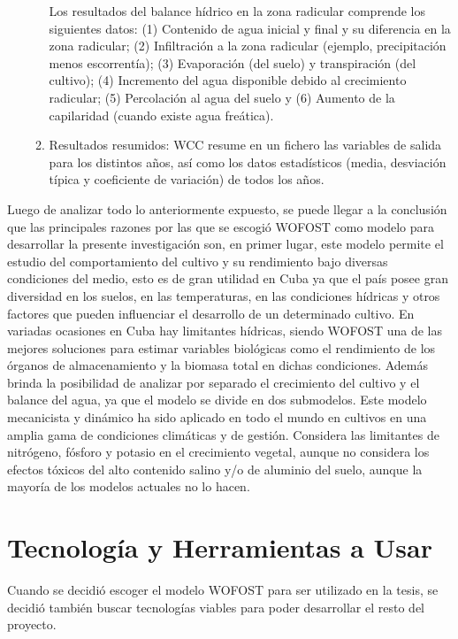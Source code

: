 \begin{enumerate}
\begin{enumerate}
		Los resultados del balance hídrico en la zona radicular comprende los siguientes datos: (1) Contenido de agua inicial y final y su diferencia en la zona radicular; (2) Infiltración a la zona radicular (ejemplo, precipitación menos escorrentía); (3) Evaporación (del suelo) y transpiración (del cultivo); (4) Incremento del agua disponible debido al crecimiento radicular; (5) Percolación al agua del suelo y (6) Aumento de la capilaridad (cuando existe agua freática).
		
		\item Resultados resumidos: WCC resume en un fichero las variables de salida para los distintos años, así como los datos estadísticos (media, desviación típica y coeficiente de variación) de todos los años.
	\end{enumerate}
\end{enumerate}

Luego de analizar todo lo anteriormente expuesto, se puede llegar a la conclusión que las principales razones por las que se escogió WOFOST como modelo para desarrollar la presente investigación son, en primer lugar, este modelo permite el estudio del comportamiento del cultivo y su rendimiento bajo diversas condiciones del medio, esto es de gran utilidad en Cuba ya que el país posee gran diversidad en los suelos, en las temperaturas, en las condiciones hídricas y otros factores que pueden influenciar el desarrollo de un determinado cultivo. En variadas ocasiones en Cuba hay limitantes hídricas, siendo WOFOST una de las mejores soluciones para estimar variables biológicas como el rendimiento de los órganos de almacenamiento y la biomasa total en dichas condiciones. Además brinda la posibilidad de analizar por separado el crecimiento del cultivo y el balance del agua, ya que el modelo se divide en dos submodelos. Este modelo mecanicista y dinámico ha sido aplicado en todo el mundo en cultivos en una amplia gama de condiciones climáticas y de gestión. Considera las limitantes de nitrógeno, fósforo y potasio en el crecimiento vegetal, aunque no considera los efectos tóxicos del alto contenido salino y/o de aluminio del suelo, aunque la mayoría de los modelos actuales no lo hacen.

\section{Tecnología y Herramientas a Usar}

Cuando se decidió escoger el modelo WOFOST para ser utilizado en la tesis, se decidió también buscar tecnologías viables para poder desarrollar el resto del proyecto.\\

